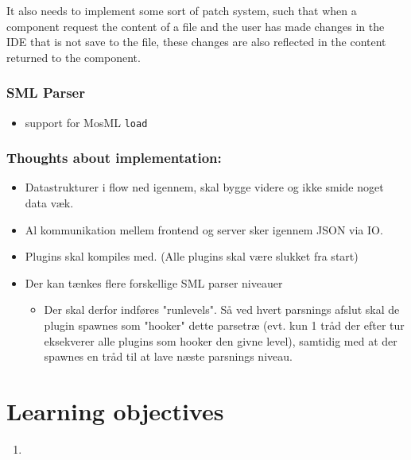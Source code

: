 \documentclass[a4paper,oneside]{memoir}
\begin{document}
It also needs to implement some sort of patch system, such that when a
component request the content of a file and the user has made changes
in the IDE that is not save to the file, these changes are also
reflected in the content returned to the component.


\subsubsection{SML Parser}
\begin{itemize}
\item support for MosML \texttt{load}
\end{itemize}


\subsubsection{Thoughts about implementation:}
\begin{itemize}
\item Datastrukturer i flow ned igennem, skal bygge videre og ikke smide noget
  data væk.

\item Al kommunikation mellem frontend og server sker igennem JSON via IO.

\item Plugins skal kompiles med. (Alle plugins skal være slukket fra start)


\item Der kan tænkes flere forskellige SML parser niveauer
  \begin{itemize}

  \item Der skal derfor indføres "runlevels". Så ved hvert parsnings
    afslut skal de plugin spawnes som "hooker" dette parsetræ
    (evt. kun 1 tråd der efter tur eksekverer alle plugins som hooker
    den givne level), samtidig med at der spawnes en tråd til at lave
    næste parsnings niveau.
  \end{itemize}
\end{itemize}

\section{Learning objectives}

\begin{enumerate}
\item
\end{enumerate}
\end{document}
